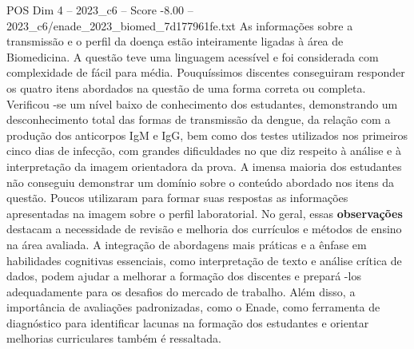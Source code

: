 \begin{textsample}{POS Dim 4 – 2023\_c6 – Score -8.00 – 2023\_c6/enade\_2023\_biomed\_7d177961fe.txt}
As informações sobre a transmissão e o perfil da doença estão inteiramente ligadas à área de Biomedicina.
A questão teve uma linguagem acessível e foi considerada com complexidade de fácil para média.
Pouquíssimos discentes conseguiram responder os quatro itens abordados na questão de uma forma correta ou completa.
Verificou -se um nível baixo de conhecimento dos estudantes, demonstrando um desconhecimento total das formas de transmissão da dengue, da relação com a produção dos anticorpos IgM e IgG, bem como dos testes utilizados nos primeiros cinco dias de infecção, com grandes dificuldades no que diz respeito à análise e à interpretação da imagem orientadora da prova.
A imensa maioria dos estudantes não conseguiu demonstrar um domínio sobre o conteúdo abordado nos itens da questão.
Poucos utilizaram para formar suas respostas as informações apresentadas na imagem sobre o perfil laboratorial.
No geral, essas \textbf{observações} destacam a necessidade de revisão e melhoria dos currículos e métodos de ensino na área avaliada.
A integração de abordagens mais práticas e a ênfase em habilidades cognitivas essenciais, como interpretação de texto e análise crítica de dados, podem ajudar a melhorar a formação dos discentes e prepará -los adequadamente para os desafios do mercado de trabalho.
Além disso, a importância de avaliações padronizadas, como o Enade, como ferramenta de diagnóstico para identificar lacunas na formação dos estudantes e orientar melhorias curriculares também é ressaltada.

\end{textsample}
